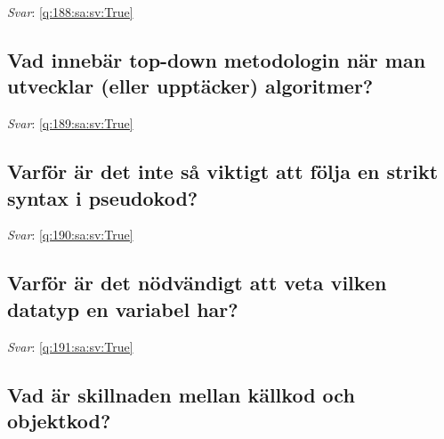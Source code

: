 \documentclass[a4paper,11pt,oneside]{article}
\begin{document}
\begin{sloppypar}
\textit{Svar}: \autoref{q:188:sa:sv:True}



\subsection{Vad inneb\"ar top-down metodologin n\"ar man utvecklar (eller uppt\"acker) algoritmer?}

\label{q:189:sa:sv:False}

\vspace{2cm}

\noindent\makebox[\textwidth]{\hrulefill}

\vspace{1cm}

\textit{Svar}: \autoref{q:189:sa:sv:True}



\subsection{Varf\"or \"ar det inte s\r{a} viktigt att f\"olja en strikt syntax i pseudokod?}

\label{q:190:sa:sv:False}

\vspace{2cm}

\noindent\makebox[\textwidth]{\hrulefill}

\vspace{1cm}

\textit{Svar}: \autoref{q:190:sa:sv:True}



\subsection{Varf\"or \"ar det n\"odv\"andigt att veta vilken datatyp en variabel har?}

\label{q:191:sa:sv:False}

\vspace{2cm}

\noindent\makebox[\textwidth]{\hrulefill}

\vspace{1cm}

\textit{Svar}: \autoref{q:191:sa:sv:True}



\subsection{Vad \"ar skillnaden mellan k\"allkod och objektkod?}


\end{sloppypar}
\end{document}
